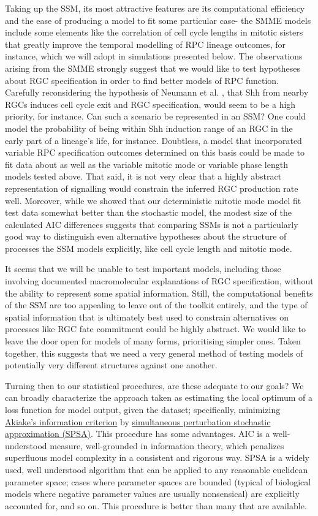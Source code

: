\documentclass{ut-thesis}
\begin{document}
\begin{NoHyper}
Taking up the SSM, its most attractive features are its computational efficiency and the ease of producing a model to fit some particular case-  the SMME models include some elements like the correlation of cell cycle lengths in mitotic sisters that greatly improve the temporal modelling of RPC lineage outcomes, for instance, which we will adopt in simulations presented below. The observations arising from the SMME strongly suggest that we would like to test hypotheses about RGC specification in order to find better models of RPC function. Carefully reconsidering the hypothesis of Neumann et al. \cite{Neumann2000}, that Shh from nearby RGCs induces cell cycle exit and RGC specification, would seem to be a high priority, for instance. Can such a scenario be represented in an SSM? One could model the probability of being within Shh induction range of an RGC in the early part of a lineage's life, for instance. Doubtless, a model that incorporated variable RPC specification outcomes determined on this basis could be made to fit data about as well as the variable mitotic mode or variable phase length models tested above. That said, it is not very clear that a highly abstract representation of signalling would constrain the inferred RGC production rate well. Moreover, while we showed that our deterministic mitotic mode model fit test data somewhat better than the stochastic model, the modest size of the calculated AIC differences suggests that comparing SSMs is not a particularly good way to distinguish even alternative hypotheses about the structure of processes the SSM models explicitly, like cell cycle length and mitotic mode. 

It seems that we will be unable to test important models, including those involving documented macromolecular explanations of RGC specification, without the ability to represent some spatial information. Still, the computational benefits of the SSM are too appealing to leave out of the toolkit entirely, and the type of spatial information that is ultimately best used to constrain alternatives on processes like RGC fate commitment could be highly abstract. We would like to leave the door open for models of many forms, prioritising simpler ones. Taken together, this suggests that we need a very general method of testing models of potentially very different structures against one another.

Turning then to our statistical procedures, are these adequate to our goals? We can broadly characterize the approach taken as estimating the local optimum of a loss function for model output, given the dataset; specifically, minimizing \hyperref[ssec:AIC]{Akiake's information criterion} by \hyperref[ssec:SPSA]{simultaneous perturbation stochastic approximation (SPSA)}. This procedure has some advantages. AIC is a well-understood measure, well-grounded in information theory, which penalizes superfluous model complexity in a consistent and rigorous way. SPSA is a widely used, well understood algorithm that can be applied to any reasonable euclidean parameter space; cases where parameter spaces are bounded (typical of biological models where negative parameter values are usually nonsensical) are explicitly accounted for, and so on. This procedure is better than many that are available.


\end{NoHyper}
\end{document}
